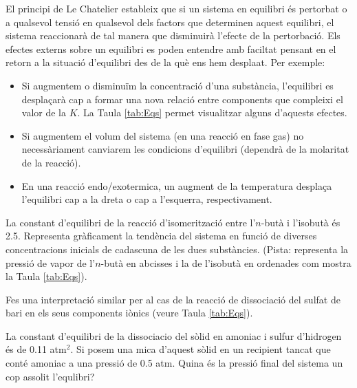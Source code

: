 El principi de Le Chatelier estableix que si un sistema en equilibri és pertorbat o a qualsevol tensió en qualsevol dels factors que determinen aquest equilibri, el sistema reaccionarà de tal manera que disminuirà l'efecte de la pertorbació. 
 Els efectes externs sobre un equilibri es poden entendre amb faciltat pensant en el retorn a la situació d'equilibri des de la què ens hem desplaat. Per exemple:

\begin{itemize}
\item Si augmentem o disminuïm la concentració d'una substància, l'equilibri es desplaçarà cap a formar una nova relació entre components que compleixi el valor de la $K$. La Taula \ref{tab:Eqs} permet visualitzar alguns d'aquests efectes.
\item Si augmentem el volum del sistema (en una reacció en fase gas) no necessàriament canviarem les condicions d'equilibri (dependrà de la molaritat de la reacció).
\item En una reacció endo/exotermica, un augment de la temperatura desplaça l'equilibri cap a la dreta o cap a l'esquerra, respectivament.
\end{itemize}

\begin{exr}
La constant d'equilibri de la reacció d'isomerització entre l'$n$-butà i l'isobutà és 2.5. Representa gràficament la tendència del sistema en funció de diverses concentracions inicials de cadascuna de les dues substàncies. (Pista: representa la pressió de vapor de l'$n$-butà en abcisses i la de l'isobutà en ordenades com mostra la Taula \ref{tab:Eqs}).
\end{exr}

\begin{exr}
Fes una interpretació similar per al cas de la reacció de dissociació del sulfat de bari en els seus components iònics (veure Taula \ref{tab:Eqs}).
\end{exr}

\begin{exr}
La constant d'equilibri de la dissociacio del  sòlid en amoniac i sulfur d'hidrogen és de 0.11 atm$^2$. Si posem una mica d'aquest sòlid en un recipient tancat que conté amoniac a una pressió de 0.5 atm. Quina és la pressió final del sistema un cop assolit l'equlibri?
\end{exr}

